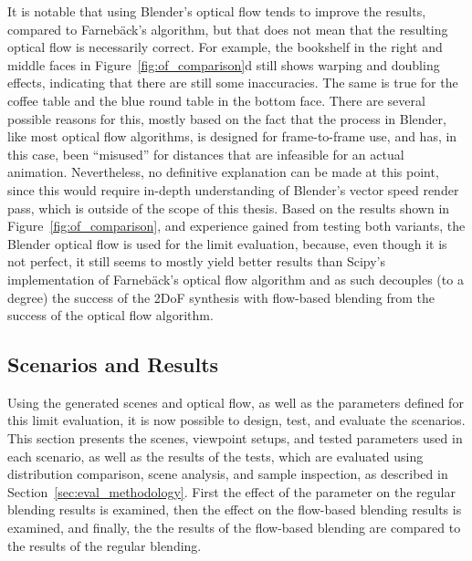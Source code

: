 It is notable that using Blender's optical flow tends to improve the results, compared to Farneb\"ack's algorithm, but that does not mean that the resulting optical flow is necessarily correct. For example, the bookshelf in the right and middle faces in Figure~\ref{fig:of_comparison}d still shows warping and doubling effects, indicating that there are still some inaccuracies. The same is true for the coffee table and the blue round table in the bottom face. There are several possible reasons for this, mostly based on the fact that the process in Blender, like most optical flow algorithms, is designed for frame-to-frame use, and has, in this case, been ``misused'' for distances that are infeasible for an actual animation. Nevertheless, no definitive explanation can be made at this point, since this would require in-depth understanding of Blender's vector speed render pass, which is outside of the scope of this thesis. Based on the results shown in Figure~\ref{fig:of_comparison}, and experience gained from testing both variants, the Blender optical flow is used for the limit evaluation, because, even though it is not perfect, it still seems to mostly yield better results than Scipy's implementation of Farneb\"ack's optical flow algorithm and as such decouples (to a degree) the success of the 2DoF synthesis with flow-based blending from the success of the optical flow algorithm.


\subsection{Scenarios and Results}
Using the generated scenes and optical flow, as well as the parameters defined for this limit evaluation, it is now possible to design, test, and evaluate the scenarios. This section presents the scenes, viewpoint setups, and tested parameters used in each scenario, as well as the results of the tests, which are evaluated using distribution comparison, scene analysis, and sample inspection, as described in Section~\ref{sec:eval_methodology}. First the effect of the parameter on the regular blending results is examined, then the effect on the flow-based blending results is examined, and finally, the the results of the flow-based blending are compared to the results of the regular blending.

